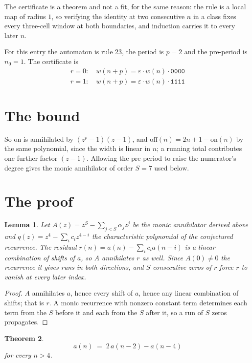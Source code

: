 \documentclass[11pt,a4paper]{article}
\theoremstyle{plain}
\newtheorem{theorem}{Theorem}
\newtheorem{lemma}[theorem]{Lemma}
\theoremstyle{definition}
\begin{document}
The certificate is a theorem and not a fit, for the same reason: the rule is a local map of
radius $1$, so verifying the identity at two consecutive $n$ in a class fixes every three-cell
window at both boundaries, and induction carries it to every later $n$.

For this entry the automaton is rule 23, the period is $p=2$ and the pre-period is $n_0=1$.
The certificate is
\begin{gather*}
r=0:\quad w(n+p) = \varepsilon \cdot w(n) \cdot \texttt{0000} \\
r=1:\quad w(n+p) = \varepsilon \cdot w(n) \cdot \texttt{1111}
\end{gather*}

\section{The bound}

So
$\mathrm{on}$ is annihilated by $(z^p-1)(z-1)$, and $\mathrm{off}(n)=2n+1-\mathrm{on}(n)$ by
the same polynomial, since the width is linear in $n$; a running total contributes one further
factor $(z-1)$. Allowing the pre-period to raise the numerator's degree gives the monic
annihilator of order $S=7$ used below.

\section{The proof}

\begin{lemma}\label{lem:crit}
Let $A(z)=z^S-\sum_{j<S}\alpha_jz^{j}$ be the monic annihilator derived above and
$q(z)=z^{4}-\sum_ic_iz^{4-i}$ the characteristic polynomial of the conjectured
recurrence. The residual $r(n)=a(n)-\sum_ic_ia(n-i)$ is a linear combination of shifts of $a$,
so $A$ annihilates $r$ as well. Since $A(0)\ne0$ the recurrence it gives runs in both
directions, and $S$ consecutive zeros of $r$ force $r$ to vanish at every later index.
\end{lemma}

\begin{proof}
$A$ annihilates $a$, hence every shift of $a$, hence any linear combination of shifts; that is
$r$. A monic recurrence with nonzero constant term determines each term from the $S$ before it
and each from the $S$ after it, so a run of $S$ zeros propagates.
\end{proof}

\begin{theorem}
\[
a(n)\;=\;2\,a(n-2) - a(n-4)
\]
for every $n>4$.
\end{theorem}
\end{document}
